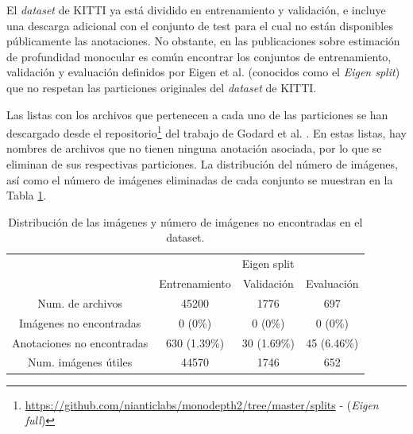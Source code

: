 El \textit{dataset} de KITTI ya está dividido en entrenamiento y validación, e incluye una descarga adicional con el conjunto de test para el cual no están disponibles públicamente las anotaciones. No obstante, en las publicaciones sobre estimación de profundidad monocular \cite{visiontransformersDPT, monodepth,midas-intel, bts} es común encontrar los conjuntos de entrenamiento, validación y evaluación definidos por Eigen et al. \cite{eigen-multi-scale} (conocidos como el \textit{Eigen split}) que no respetan las particiones originales del \textit{dataset} de KITTI. 

Las listas con los archivos que pertenecen a cada uno de las particiones se han descargado desde el repositorio\footnote{\url{https://github.com/nianticlabs/monodepth2/tree/master/splits} - (\textit{Eigen full})} del trabajo de Godard et al. \cite{monodepth}. En estas listas, hay nombres de archivos que no tienen ninguna anotación asociada, por lo que se eliminan de sus respectivas particiones. La distribución del número de imágenes, así como el número de imágenes eliminadas de cada conjunto se muestran en la Tabla \ref{tab:kitti-splits}.


\begin{table}[H]
\centering
\begin{tabular}{@{}cccc@{}}
\toprule
\multicolumn{1}{l}{}       & \multicolumn{1}{l}{} & \multicolumn{1}{l}{Eigen split} & \multicolumn{1}{l}{} \\ \cmidrule(l){2-4} 
\rowcolor[HTML]{FFFFFF} 
                        & Entrenamiento & Validación & Evaluación \\ \midrule
\rowcolor[HTML]{EFEFEF} 
Num. de archivos        & 45200         & 1776       & 697        \\
\rowcolor[HTML]{FFFFFF} 
Imágenes no encontradas & 0 (0\%)       & 0 (0\%)    & 0 (0\%)    \\
\rowcolor[HTML]{EFEFEF} 
Anotaciones no encontradas & 630 (1.39\%)         & 30 (1.69\%)                     & 45 (6.46\%)          \\
\rowcolor[HTML]{FFFFFF} 
Num. imágenes útiles    & 44570         & 1746       & 652        \\ \bottomrule
\end{tabular}
\caption{Distribución de las imágenes y número de imágenes no encontradas en el dataset.}
\label{tab:kitti-splits}
\end{table}

